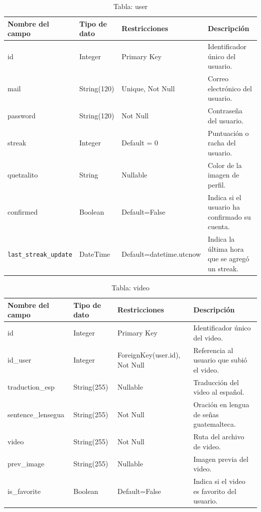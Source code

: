 
\begin{table}[H]
\centering
\begin{tabularx}{\textwidth}{|l|l|l|X|}
\hline
\textbf{Nombre del campo} & \textbf{Tipo de dato} & \textbf{Restricciones} & \textbf{Descripción} \\ \hline
id                       & Integer               & Primary Key            & Identificador único del usuario. \\ \hline
mail                     & String(120)           & Unique, Not Null       & Correo electrónico del usuario. \\ \hline
password                 & String(120)           & Not Null               & Contraseña del usuario. \\ \hline
streak                   & Integer               & Default = 0            & Puntuación o racha del usuario. \\ \hline
quetzalito               & String                & Nullable               & Color de la imagen de perfil. \\ \hline
confirmed                & Boolean               & Default=False          & Indica si el usuario ha confirmado su cuenta. \\ \hline
\texttt{last\_streak\_update} & DateTime            & Default=datetime.utcnow & Indica la última hora que se agregó un streak. \\ \hline
\end{tabularx}
\caption{Tabla: user}
\end{table}

\begin{table}[H]
\centering
\begin{tabularx}{\textwidth}{|l|l|l|X|}
\hline
\textbf{Nombre del campo} & \textbf{Tipo de dato} & \textbf{Restricciones} & \textbf{Descripción} \\ \hline
id                       & Integer               & Primary Key            & Identificador único del video. \\ \hline
id\_user                 & Integer               & ForeignKey(user.id), Not Null & Referencia al usuario que subió el video. \\ \hline
traduction\_esp          & String(255)           & Nullable                & Traducción del video al español. \\ \hline
sentence\_lensegua       & String(255)           & Not Null                & Oración en lengua de señas guatemalteca. \\ \hline
video                    & String(255)           & Not Null                & Ruta del archivo de video. \\ \hline
prev\_image              & String(255)           & Nullable                & Imagen previa del video. \\ \hline
is\_favorite             & Boolean               & Default=False           & Indica si el video es favorito del usuario. \\ \hline
\end{tabularx}
\caption{Tabla: video}
\end{table}

